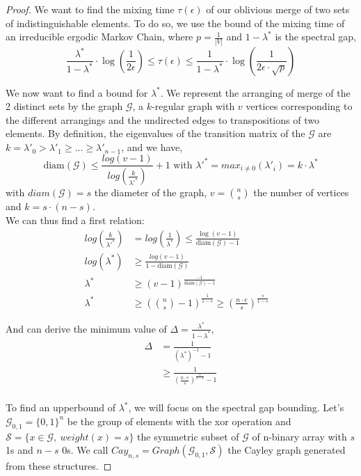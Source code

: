 \documentclass[english,oneside,twocolumn]{article}
\begin{document}
\begin{proof}
We want to find the mixing time $\tau(\epsilon)$ of our oblivious merge of two sets of indistinguishable elements. To do so, we use the bound of the mixing time of an irreducible ergodic Markov Chain, where $p = \frac{1}{|V|}$ and $1-\lambda^*$ is the spectral gap,
$$\frac{\lambda^*}{1-\lambda^*} \cdot \log\left(\frac{1}{2 \epsilon} \right)\leq \tau(\epsilon) \leq \frac{1}{1-\lambda^*}\cdot \log \left( \frac{1}{2 \epsilon \cdot \sqrt{p}}\right) $$

We now want to find a bound for $\lambda^*$. We represent the arranging of merge of the 2 distinct sets by the graph $\mathcal{G}$, a $k$-regular graph with $v$ vertices corresponding to the different arrangings and the undirected edges to transpositions of two elements.
By definition, the eigenvalues of the transition matrix of the $\mathcal{G}$ are $k={\lambda'}_0 > {\lambda'}_1 \geq  ... \geq {\lambda'}_{n-1}$, and we have,
$$\text{diam}\left( \mathcal{G}\right) \leq \frac{log(v-1)}{log(\frac{k}{{\lambda'}^*})}+1 \text{ with } {\lambda'}^* = max_{i\neq0}({\lambda'}_i)= k \cdot \lambda^*$$
with $diam\left( \mathcal{G} \right)=s$ the diameter of the graph, $v= {n \choose s}$ the number of vertices and $k=s\cdot(n-s)$.\\


We can thus find a first relation:
\begin{align*}
log(\frac{k}{{\lambda'}^*}) &= log(\frac{1}{{\lambda}^*}) \leq\frac{\log(v-1)}{\text{diam}\left(\mathcal{G}\right)-1}&\\
log({{\lambda}^*}) &\geq  \frac{log(v-1)}{1-\text{diam}\left(\mathcal{G}\right)}&\\
{\lambda}^* &\geq (v-1)^{\frac{-1}{\text{diam}\left(\mathcal{G}\right)-1}}\\
{\lambda}^* &\geq \left ({n \choose s}-1 \right )^{\frac{1}{1-s}} \geq \left (\frac{n\cdot e}{s} \right )^{\frac{s}{1-s}}
\end{align*}

And can derive the minimum value of $\Delta=\frac{\lambda^*}{1-\lambda^*}$,
\begin{align*}
 \Delta &= \frac{1}{\left (\lambda^*\right )^{-1}-1}\\
 &\geq \frac{1}{\left (\frac{n \cdot e }{s} \right )^{\frac{s}{s-1}}-1}\\
\end{align*}


To find an upperbound of $\lambda^*$, we will focus on the spectral gap bounding.
Let's $\mathcal{G}_{0,1}=\{0,1\}^n$ be the group of elements with the xor operation and $\mathcal{S}=\{x \in \mathcal{G},\ weight(x)=s\}$ the symmetric subset of $\mathcal{G}$ of n-binary array with $s$ 1s and $n-s$ 0s.
We call $Cay_{n,s}=Graph\left(  \mathcal{G}_{0,1}, \mathcal{S} \right) $ the Cayley graph generated from these structures.


\end{proof}
\end{document}
